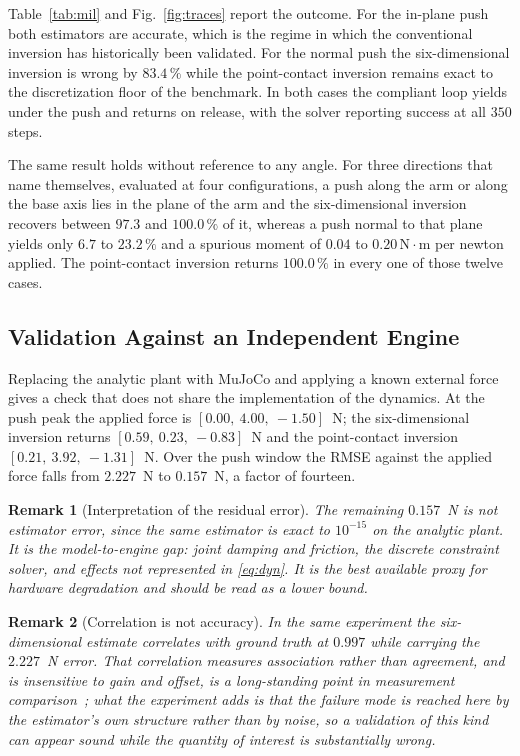 \documentclass{ieeeaccess}
\newtheorem{remark}{Remark}
\begin{document}
Table~\ref{tab:mil} and Fig.~\ref{fig:traces} report the outcome. For the in-plane
push both estimators are accurate, which is the regime in which the conventional
inversion has historically been validated. For the normal push the
six-dimensional inversion is wrong by $83.4\,\%$ while the point-contact inversion
remains exact to the discretization floor of the benchmark. In both cases the
compliant loop yields under the push and returns on release, with the solver
reporting success at all $350$ steps.

The same result holds without reference to any angle. For three directions that
name themselves, evaluated at four configurations, a push along the arm or along
the base axis lies in the plane of the arm and the six-dimensional inversion
recovers between $97.3$ and $100.0\,\%$ of it, whereas a push normal to that plane
yields only $6.7$ to $23.2\,\%$ and a spurious moment of $0.04$ to
$0.20\,\mathrm{N}\cdot\mathrm{m}$ per newton applied. The point-contact inversion
returns $100.0\,\%$ in every one of those twelve cases.

\subsection{Validation Against an Independent Engine}
\label{sec:res-mujoco}
Replacing the analytic plant with MuJoCo and applying a known external force gives
a check that does not share the implementation of the dynamics. At the push peak
the applied force is $[0.00,\ 4.00,\ -1.50]$~N; the six-dimensional inversion
returns $[0.59,\ 0.23,\ -0.83]$~N and the point-contact inversion
$[0.21,\ 3.92,\ -1.31]$~N. Over the push window the RMSE against the applied force
falls from $2.227$~N to $0.157$~N, a factor of fourteen.

\begin{remark}[Interpretation of the residual error]
The remaining $0.157$~N is not estimator error, since the same estimator is exact
to $10^{-15}$ on the analytic plant. It is the model-to-engine gap: joint damping
and friction, the discrete constraint solver, and effects not represented in
\eqref{eq:dyn}. It is the best available proxy for hardware degradation and should
be read as a lower bound.
\end{remark}

\begin{remark}[Correlation is not accuracy]
In the same experiment the six-dimensional estimate correlates with ground truth
at $0.997$ while carrying the $2.227$~N error. That correlation measures
association rather than agreement, and is insensitive to gain and offset, is a
long-standing point in measurement comparison~\cite{bland1986agreement}; what the
experiment adds is that the failure mode is reached here by the estimator's own
structure rather than by noise, so a validation of this kind can appear sound
while the quantity of interest is substantially wrong.
\end{remark}
\end{document}
